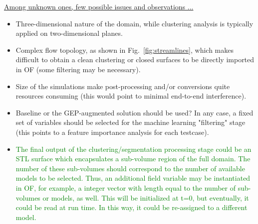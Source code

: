 \vspace{10pt}
\underline{Among unknown ones, few possible issues and observations ...}
\begin{itemize}
\item Three-dimensional nature of the domain, while clustering analysis is typically applied on two-dimensional planes.
\item Complex flow topology, as shown in Fig.~\ref{fig:streamlines}, which makes difficult to obtain a clean clustering or closed surfaces to be directly imported in OF (some filtering may be necessary).
\item Size of the simulations make post-processing and/or conversions quite resources consuming (this would point to minimal end-to-end interference).
\item Baseline or the GEP-augmented solution should be used? In any case, a fixed set of variables should be selected for the machine learning "filtering" stage (this points to a feature importance analysis for each testcase).
\item \textcolor{green}{The final output of the clustering/segmentation processing stage could be an STL surface which encapsulates a sub-volume region of the full domain. The number of these sub-volumes should correspond to the number of available models to be selected. Thus, an additional field variable may be instantiated in OF, for example, a integer vector with length equal to the number of sub-volumes or models, as well. This will be initialized at t=0, but eventually, it could be read at run time. In this way, it could be re-assigned to a different model.}
\end{itemize}

